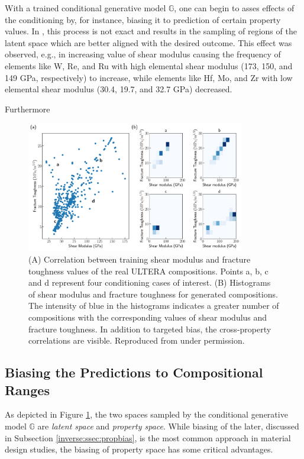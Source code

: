 With a trained conditional generative model $\mathbb{G}$, one can begin to asses effects of the conditioning by, for instance, biasing it to prediction of certain property values. In \citet{Debnath2021GenerativeAlloys}, this process is not exact and results in the sampling of regions of the latent space which are better aligned with the desired outcome. This effect was observed, e.g., in increasing value of shear modulus causing the frequency of elements like W, Re, and Ru with high elemental shear modulus (173, 150, and 149 GPa, respectively) to increase, while elements like Hf, Mo, and Zr with low elemental shear modulus (30.4, 19.7, and 32.7 GPa) decreased.

Furthermore

\begin{figure}[H]
    \centering
    \includegraphics[width=0.85\textwidth]{inversedesign/fixed_cond_multi_points.pdf}
    \caption{(A) Correlation between training shear modulus and fracture toughness values of the real ULTERA compositions. Points a, b, c and d represent four conditioning cases of interest. (B) Histograms of shear modulus and fracture toughness for generated compositions. The intensity of blue in the histograms indicates a greater number of compositions with the corresponding values of shear modulus and fracture toughness. In addition to targeted bias, the cross-property correlations are visible. Reproduced from \cite{Debnath2021GenerativeAlloys} under permission.}
    \label{inverse:fig:designs}
\end{figure}


\subsection{Biasing the Predictions to Compositional Ranges} \label{inverse:ssec:compbias}

As depicted in Figure \ref{inverse:fig:designs}, the two spaces sampled by the conditional generative model $\mathbb{G}$ are \emph{latent space} and \emph{property space}. While biasing of the later, discussed in Subsection \ref{inverse:ssec:propbias}, is the most common approach in material design studies, the biasing of property space has some critical advantages.

